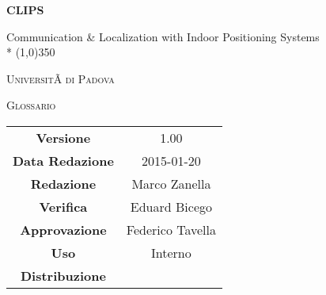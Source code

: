 \documentclass[a4paper]{article}
\author{Zanella Marco}
\date{07/12/2015}
\begin{document}
\begin{titlepage}
	\centering
	{\huge\bfseries CLIPS\par}
	Communication \& Localization with Indoor Positioning Systems \\*
	\line(1,0){350} \\
	{\scshape\LARGE UniversitÃ  di Padova \par}
	\vspace{1cm}
	{\scshape\Large Glossario \par}
	\logo
	\newpage
		\begin{tabular}{c|c}
			{\hfill \textbf{Versione}} 			& 1.00			\\[1ex]
			{\hfill\textbf{Data Redazione}} 	& 2015-01-20  \\[1ex]
			{\hfill\textbf{Redazione}} 			&  Marco Zanella      \\[1ex]
			{\hfill\textbf{Verifica}} 			&  Eduard Bicego	\\[1ex]
			{\hfill\textbf{Approvazione}} 		&  Federico Tavella	\\[1ex] 
			{\hfill\textbf{Uso}} 				& Interno		\\[1ex] 
			{\hfill\textbf{Distribuzione}} 		& \leaf 	\\[1ex]
		\end{tabular}
	\end{titlepage}
\pagestyle{mymain}
	
		
	\newpage

\glsaddall
\printglossary[style=indexgroup, nonumberlist]
\label{LastPage}
\end{document}
